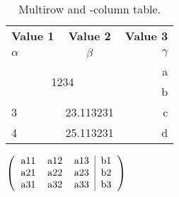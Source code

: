 \documentclass{article}
\begin{document}
\begin{table}[h!]
    \begin{center}
      \caption{Multirow and -column table.}
      \label{tab:table1}
      \begin{tabular}{l|c|r}
      \toprule
        \textbf{Value 1} & \textbf{Value 2} & \textbf{Value 3}\\
        $\alpha$ & $\beta$ & $\gamma$ \\
        \midrule
        \hline
        \multicolumn{2}{c|}{\multirow{2}{*}{1234}} & a\\ %
        \multicolumn{2}{c|}{} & b\\ %
        \hline
        3 & 23.113231 & c\\
        4 & 25.113231 & d\\
        \bottomrule
      \end{tabular}
    \end{center}
  \end{table}
    
  \begin{table}
      
  $\left(\begin{tabular}{ccc|c}

    a11 & a12 & a13  & b1 \\
    a21 & a22  & a23 & b2  \\ 
    a31 & a32  & a33 & b3  \\
    
    \end{tabular}\right)$
  \end{table}
\end{document}
